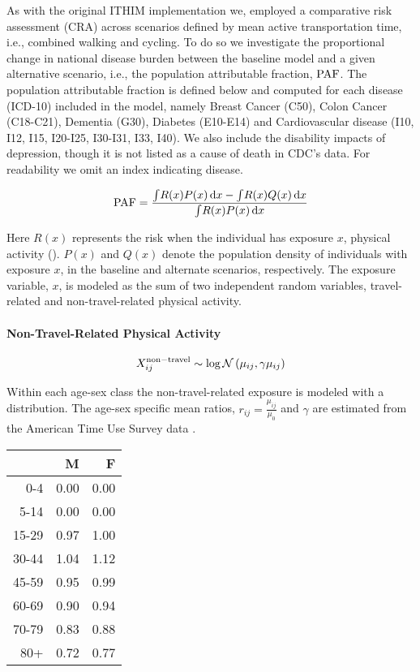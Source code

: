 As with the original ITHIM implementation we, employed a comparative
risk assessment (CRA) across scenarios defined by mean active
transportation time, i.e., combined walking and cycling.  To do so we
investigate the proportional change in national disease burden between
the baseline model and a given alternative scenario, i.e., the
population attributable fraction, $\mathrm{PAF}$.  The population attributable
fraction is defined below and computed for each disease (ICD-10) included in
the model, namely Breast Cancer (C50), Colon Cancer (C18-C21), Dementia (G30),
Diabetes (E10-E14) and Cardiovascular disease (I10, I12, I15, I20-I25, I30-I31, I33, I40).  We also include the disability impacts of depression, though it is not listed as a cause of death in CDC's data. For readability we omit an index
indicating disease.

\begin{equation}
\mathrm{PAF} = \frac{\int \! R(x)P(x) \, \mathrm{d}x  - \int \! R(x)Q(x) \,
  \mathrm{d}x}{\int \! R(x)P(x) \, \mathrm{d}x} \label{paf}
\end{equation}

Here $R(x)$ represents the risk when the individual has exposure $x$,
physical activity (\mets).  $P(x)$ and $Q(x)$ denote the population
density of individuals with exposure $x$, in the baseline and
alternate scenarios, respectively.  The exposure variable, $x$, is
modeled as the sum of two independent random variables, travel-related
and non-travel-related physical activity.

\paragraph{Non-Travel-Related Physical Activity}

\begin{equation}
X_{ij}^{\mathrm{non-travel}} \sim \log\mathcal{N}\left(\mu_{ij}, \gamma \mu_{ij}\right)
\end{equation}

Within each age-sex class the non-travel-related exposure is modeled
with a \logNormal{} distribution.  The age-sex specific mean ratios,
$r_{ij} = \frac{\mu_{ij}}{\mu_0}$ and $\gamma$ are estimated from the
American Time Use Survey data \cite{ATUS}.

\begin{table}[ht]
\centering
\begin{tabular}{rrr}
  \hline
 & M & F \\
  \hline
0-4 & 0.00 & 0.00 \\
  5-14 & 0.00 & 0.00 \\
  15-29 & 0.97 & 1.00 \\
  30-44 & 1.04 & 1.12 \\
  45-59 & 0.95 & 0.99 \\
  60-69 & 0.90 & 0.94 \\
  70-79 & 0.83 & 0.88 \\
  80+ & 0.72 & 0.77 \\
   \hline
\end{tabular}
\end{table}

